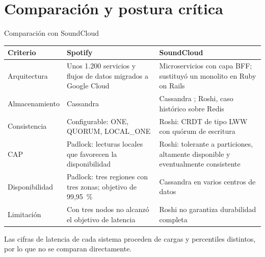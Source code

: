 \section{Comparación y postura crítica}

\begin{frame}{Comparación con SoundCloud}
  \scriptsize
  \renewcommand{\arraystretch}{1.25}
  \begin{tabular}{p{} p{} p{}}
    \toprule
    \textbf{Criterio} & \textbf{Spotify} & \textbf{SoundCloud} \\
    \midrule
    Arquitectura &
      Unos 1.200 servicios y flujos de datos migrados a Google Cloud
      \cite{googleSpotify} &
      Microservicios con capa BFF; sustituyó un monolito en Ruby on
      Rails \cite{obrien2022strangler} \\
    Almacenamiento &
      Cassandra \cite{mishra2015personalization} &
      Cassandra \cite{pythianSoundcloud}; Roshi, caso histórico sobre
      Redis \cite{bourgon2014roshi} \\
    Consistencia &
      Configurable: ONE, QUORUM, LOCAL\_ONE
      \cite{cody2015cassandra,leenders2018padlock} &
      Roshi: CRDT de tipo LWW con quórum de escritura
      \cite{almeida2024crdt,soundcloudRoshi} \\
    CAP &
      Padlock: lecturas locales que favorecen la disponibilidad
      \cite{leenders2018padlock} &
      Roshi: tolerante a particiones, altamente disponible y
      eventualmente consistente \cite{soundcloudRoshi} \\
    Disponibilidad &
      Padlock: tres regiones con tres zonas; objetivo de 99,95~\%
      \cite{leenders2018padlock} &
      Cassandra en varios centros de datos \cite{pythianSoundcloud} \\
    Limitación &
      Con tres nodos no alcanzó el objetivo de latencia
      \cite{cody2015cassandra} &
      Roshi no garantiza durabilidad completa \cite{soundcloudRoshi} \\
    \bottomrule
  \end{tabular}

  \medskip
  {\tiny Las cifras de latencia de cada sistema proceden de cargas y
  percentiles distintos, por lo que no se comparan directamente.}
\end{frame}


